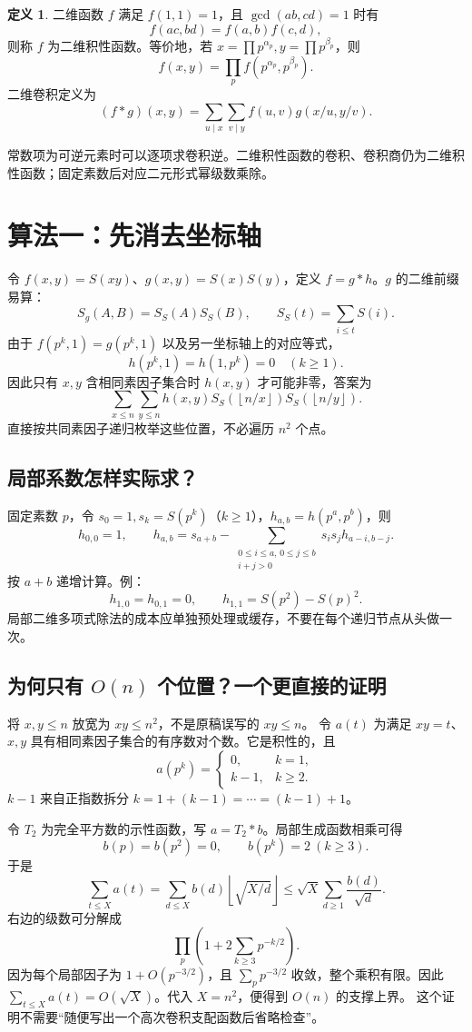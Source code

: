 \documentclass[UTF8,a4paper,11pt,twoside,openright,fontset=fandol]{ctexbook}
\theoremstyle{definition}
\newtheorem{definition}{定义}[chapter]
\newcommand{\floor}[1]{\left\lfloor #1\right\rfloor}
\begin{document}
\begin{definition}
二维函数 $f$ 满足 $f(1,1)=1$，且 $\gcd(ab,cd)=1$ 时有
\[
 f(ac,bd)=f(a,b)f(c,d),
\]
则称 $f$ 为二维积性函数。等价地，若 $x=\prod p^{\alpha_p},y=\prod p^{\beta_p}$，则
\[
 f(x,y)=\prod_p f(p^{\alpha_p},p^{\beta_p}).
\]
二维卷积定义为
\[
 (f*g)(x,y)=\sum_{u\mid x}\sum_{v\mid y}f(u,v)g(x/u,y/v).
\]
\end{definition}
常数项为可逆元素时可以逐项求卷积逆。二维积性函数的卷积、卷积商仍为二维积性函数；固定素数后对应二元形式幂级数乘除。


\section{算法一：先消去坐标轴}
令 $f(x,y)=S(xy)$、$g(x,y)=S(x)S(y)$，定义 $f=g*h$。$g$ 的二维前缀易算：
\[
 S_g(A,B)=S_S(A)S_S(B),\qquad S_S(t)=\sum_{i\le t}S(i).
\]
由于 $f(p^k,1)=g(p^k,1)$ 以及另一坐标轴上的对应等式，
\[
 h(p^k,1)=h(1,p^k)=0\quad(k\ge1).
\]
因此只有 $x,y$ 含相同素因子集合时 $h(x,y)$ 才可能非零，答案为
\[
 \sum_{x\le n}\sum_{y\le n}h(x,y)
 S_S(\floor{n/x})S_S(\floor{n/y}).
\]
直接按共同素因子递归枚举这些位置，不必遍历 $n^2$ 个点。


\subsection{局部系数怎样实际求？}
固定素数 $p$，令 $s_0=1,s_k=S(p^k)$（$k\ge1$），$h_{a,b}=h(p^a,p^b)$，则
\[
 h_{0,0}=1,\qquad
 h_{a,b}=s_{a+b}-\sum_{\substack{0\le i\le a,\,0\le j\le b\\i+j>0}}
 s_i s_j h_{a-i,b-j}.
\]
按 $a+b$ 递增计算。例：
\[
 h_{1,0}=h_{0,1}=0,\qquad h_{1,1}=S(p^2)-S(p)^2.
\]
局部二维多项式除法的成本应单独预处理或缓存，不要在每个递归节点从头做一次。

\subsection{为何只有 \texorpdfstring{$O(n)$}{O(n)} 个位置？一个更直接的证明}
将 $x,y\le n$ 放宽为 $xy\le n^2$，不是原稿误写的 $xy\le n$。
令 $a(t)$ 为满足 $xy=t$、$x,y$ 具有相同素因子集合的有序数对个数。它是积性的，且
\[
 a(p^k)=\begin{cases}0,&k=1,\\k-1,&k\ge2.\end{cases}
\]
$k-1$ 来自正指数拆分 $k=1+(k-1)=\cdots=(k-1)+1$。

令 $T_2$ 为完全平方数的示性函数，写 $a=T_2*b$。局部生成函数相乘可得
\[
 b(p)=b(p^2)=0,\qquad b(p^k)=2\ (k\ge3).
\]
于是
\[
\sum_{t\le X}a(t)=\sum_{d\le X}b(d)\floor{\sqrt{X/d}}
\le\sqrt X\sum_{d\ge1}\frac{b(d)}{\sqrt d}.
\]
右边的级数可分解成
\[
 \prod_p\left(1+2\sum_{k\ge3}p^{-k/2}\right).
\]
因为每个局部因子为 $1+O(p^{-3/2})$，且 $\sum_p p^{-3/2}$ 收敛，整个乘积有限。因此 $\sum_{t\le X}a(t)=O(\sqrt X)$。代入 $X=n^2$，便得到 $O(n)$ 的支撑上界。
这个证明不需要“随便写出一个高次卷积支配函数后省略检查”。
\end{document}
